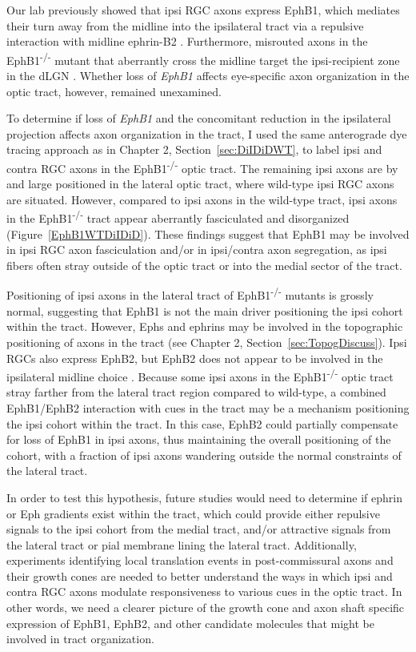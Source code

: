 Our lab previously showed that ipsi RGC axons express EphB1, which mediates their turn away from the midline into the ipsilateral tract via a repulsive interaction with midline ephrin-B2 \cite{williams2003ephrin,petros2009specificity}.
Furthermore, misrouted axons in the EphB1\textsuperscript{-/-} mutant that aberrantly cross the midline target the ipsi-recipient zone in the dLGN \cite{rebsam2009switching}.
Whether loss of \emph{EphB1} affects eye-specific axon organization in the optic tract, however, remained unexamined.

To determine if loss of \emph{EphB1} and the concomitant reduction in the ipsilateral projection affects axon organization in the tract, I used the same anterograde dye tracing approach as in Chapter 2, Section~\ref{sec:DiIDiDWT}, to label ipsi and contra RGC axons in the EphB1\textsuperscript{-/-} optic tract.
The remaining ipsi axons are by and large positioned in the lateral optic tract, where wild-type ipsi RGC axons are situated.
However, compared to ipsi axons in the wild-type tract, ipsi axons in the EphB1\textsuperscript{-/-} tract appear aberrantly fasciculated and disorganized (Figure~\ref{EphB1WTDiIDiD}).
These findings suggest that EphB1 may be involved in ipsi RGC axon fasciculation and/or in ipsi/contra axon segregation, as ipsi fibers often stray outside of the optic tract or into the medial sector of the tract.

Positioning of ipsi axons in the lateral tract of EphB1\textsuperscript{-/-} mutants is grossly normal, suggesting that EphB1 is not the main driver positioning the ipsi cohort within the tract.
However, Ephs and ephrins may be involved in the topographic positioning of axons in the tract (see Chapter 2, Section~\ref{sec:TopogDiscuss}).
Ipsi RGCs also express EphB2, but EphB2 does not appear to be involved in the ipsilateral midline choice \cite{chenaux2011forward,williams2003ephrin}.
Because some ipsi axons in the EphB1\textsuperscript{-/-} optic tract stray farther from the lateral tract region compared to wild-type, a combined EphB1/EphB2 interaction with cues in the tract may be a mechanism positioning the ipsi cohort within the tract.
In this case, EphB2 could partially compensate for loss of EphB1 in ipsi axons, thus maintaining the overall positioning of the cohort, with a fraction of ipsi axons wandering outside the normal constraints of the lateral tract.

In order to test this hypothesis, future studies would need to determine if ephrin or Eph gradients exist within the tract, which could provide either repulsive signals to the ipsi cohort from the medial tract, and/or attractive signals from the lateral tract or pial membrane lining the lateral tract.
Additionally, experiments identifying local translation events in post-commissural axons and their growth cones are needed to better understand the ways in which ipsi and contra RGC axons modulate responsiveness to various cues in the optic tract.
In other words, we need a clearer picture of the growth cone and axon shaft specific expression of EphB1, EphB2, and other candidate molecules that might be involved in tract organization.

